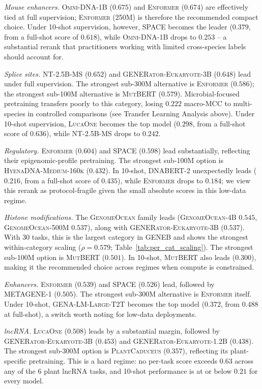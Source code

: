 \documentclass{llmxive}
\begin{document}
\textit{Mouse enhancers.} \textsc{Omni-DNA-1B} ($0.675$) and
\textsc{Enformer} ($0.674$) are effectively tied at full supervision;
\textsc{Enformer} (250M) is therefore the recommended compact choice. Under 10-shot supervision, however,
\textsc{SPACE} becomes the leader ($0.379$, from a full-shot score of
$0.618$), while \textsc{Omni-DNA-1B} drops to $0.253$ -- a substantial
rerank that practitioners working with limited cross-species labels
should account for.

\textit{Splice sites.} \textsc{NT-2.5B-MS} ($0.652$) and
\textsc{GENERator-Eukaryote-3B} ($0.648$) lead under full supervision.
The strongest sub-300M alternative is \textsc{Enformer} ($0.586$);
the strongest sub-100M alternative is \textsc{MutBERT} ($0.579$).
Microbial-focused pretraining transfers poorly to this category,
losing $0.222$ macro-MCC to multi-species in controlled comparisons
(see Transfer Learning Analysis above). Under 10-shot supervision, \textsc{LucaOne} becomes
the top model ($0.298$, from a full-shot score of $0.636$), while
\textsc{NT-2.5B-MS} drops to $0.242$.

\textit{Regulatory.} \textsc{Enformer} ($0.604$) and \textsc{SPACE}
($0.598$) lead substantially, reflecting their epigenomic-profile
pretraining. The strongest sub-100M option is \textsc{HyenaDNA-Medium-160k}
($0.432$). In 10-shot, \textsc{DNABERT-2} unexpectedly leads
($0.216$, from a full-shot score of $0.435$), while \textsc{Enformer}
drops to $0.184$; we view this rerank as protocol-fragile given the
small absolute scores in this low-data regime.

\textit{Histone modifications.} The \textsc{GenomeOcean} family leads
(\textsc{GenomeOcean-4B} $0.545$, \textsc{GenomeOcean-500M} $0.537$),
along with \textsc{GENERator-Eukaryote-3B} ($0.537$). With 30 tasks,
this is the largest category in GENEB and shows the strongest
within-category scaling ($\rho = 0.579$; Table~\ref{tab:per_cat_scaling}).
The strongest sub-100M option is \textsc{MutBERT} ($0.501$). In
10-shot, \textsc{MutBERT} also leads ($0.300$), making it the
recommended choice across regimes when compute is constrained.

\textit{Enhancers.} \textsc{Enformer} ($0.539$) and \textsc{SPACE}
($0.526$) lead, followed by \textsc{METAGENE-1} ($0.505$). The
strongest sub-300M alternative is \textsc{Enformer} itself.
Under 10-shot, \textsc{GENA-LM-Large-T2T} becomes the top model
($0.372$, from $0.488$ at full-shot), a switch worth noting for
low-data deployments.

\textit{lncRNA.} \textsc{LucaOne} ($0.508$) leads by a substantial
margin, followed by \textsc{GENERator-Eukaryote-3B} ($0.453$) and
\textsc{GENERator-Eukaryote-1.2B} ($0.438$). The strongest sub-300M
option is \textsc{PlantCaduceus} ($0.357$), reflecting its
plant-specific pretraining. This is a hard regime: no per-task score
exceeds $0.63$ across any of the 6 plant lncRNA tasks, and 10-shot
performance is at or below $0.21$ for every model.
\end{document}
